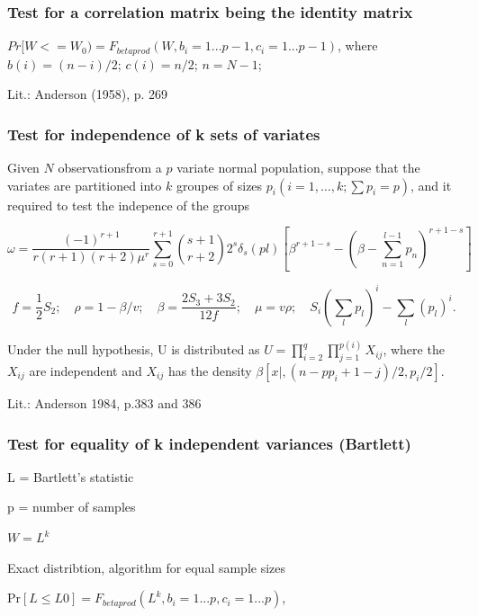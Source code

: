 \subsubsection{Test for a correlation matrix being the identity matrix}

$Pr[W<=W_0)=F_{betaprod}(W,b_i=1...p-1,c_i=1...p-1)$,
where $b(i)=(n-i)/2$;   $c(i)=n/2$;  $n=N-1$;

Lit.:	Anderson (1958), p. 269




\subsubsection{Test for independence of k sets of variates}
Given $N$ observationsfrom a $p$ variate normal population, suppose that the variates are partitioned into $k$ groupes of sizes $p_i (i=1,\ldots,k; \sum p_i = p)$, and it required to test the indepence of the groups

\begin{equation}
	\omega = \frac{(-1)^{r+1}}{r(r+1)(r+2) \mu^r} \sum_{s=0}^{r+1} \binom{s+1}{r+2} 2^s \delta_s(pl) \left[\beta^{r+1-s} - \left(\beta - \sum_{n=1}^{l-1} p_n\right)^{r+1-s}  \right]
\end{equation}

\begin{equation}
	f=\frac{1}{2}S_2; \quad \rho=1-\beta/v; \quad \beta=\frac{2S_3+3S_2}{12f}; \quad \mu=v \rho; \quad S_i (\sum_l p_l)^i - \sum_l (p_l)^i.
\end{equation}

Under the null hypothesis, U is distributed as $U = \prod_{i=2}^q \prod_{j=1}^{p(i)} X_{ij}$, where the $X_{ij}$ are independent and $X_{ij}$ has the density $\beta[x|,(n-pp_i+1-j)/2,p_i/2]$.

Lit.:	Anderson 1984, p.383 and 386






\subsubsection{Test for equality of k independent variances (Bartlett)}

L = Bartlett's statistic

p = number of samples

$W = L^k$

\vpara
Exact distribtion, algorithm for equal sample sizes

Pr$[L \leq L0] = F_{betaprod}(L^k,b_i=1...p,c_i=1...p)$,

